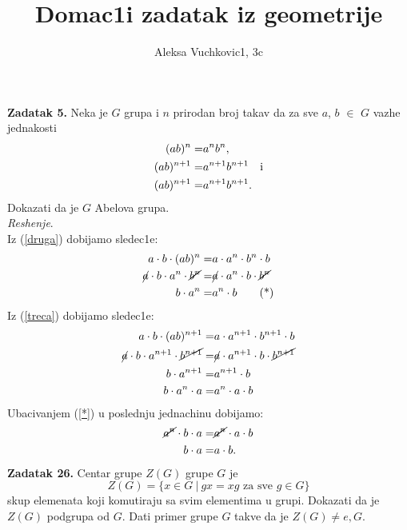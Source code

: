 \documentclass[11pt]{article}
\title{\bf{Domac1i zadatak iz geometrije}}
\author{\Large Aleksa Vuchkovic1, 3c}
\date{}
\begin{document}
\maketitle
\large

\textbf{Zadatak 5.} Neka je $G$ grupa i $n$ prirodan broj takav da za sve $a$, $b$ $\in$ $G$ vazhe jednakosti
\begin{align}
    (ab)^n=&a^nb^n,\\ 
    (ab)^{n+1}=&a^{n+1}b^{n+1} \quad{\text i }\label{druga}\\ 
    (ab)^{n+1}=&a^{n+1}b^{n+1}.\label{treca}
\end{align}
Dokazati da je $G$ Abelova grupa.\\

\textit{Reshenje}.\\
Iz (\ref{druga}) dobijamo sledec1e:
\begin{align*}
    a\cdot b\cdot(ab)^{n}=&a\cdot a^{n}\cdot b^{n}\cdot b\\
    \cancel a\cdot b\cdot a^n\cdot\cancel {b^n}=&\cancel a\cdot a^{n}\cdot b\cdot\cancel {b^{n}}\\
    b\cdot a^n=&a^{n}\cdot b \tag{*}\label{*}
\end{align*}
Iz (\ref{treca}) dobijamo sledec1e:
\begin{align*}
    a\cdot b\cdot(ab)^{n+1}=&a\cdot a^{n+1}\cdot b^{n+1}\cdot b\\
    \cancel a\cdot b\cdot a^{n+1}\cdot\cancel{b^{n+1}}=&\cancel a\cdot a^{n+1}\cdot b\cdot\cancel{b^{n+1}}\\
    b\cdot a^{n+1}=&a^{n+1}\cdot b\\
    b\cdot a^{n}\cdot a=&a^{n}\cdot a\cdot b
\end{align*}
Ubacivanjem (\ref{*}) u poslednju jednachinu dobijamo:
\begin{align*}
    \cancel{a^{n}}\cdot b\cdot a=&\cancel{a^{n}}\cdot a\cdot b\\
    b\cdot a=&a\cdot b.
\end{align*}
\textbf{Zadatak 26.} Centar grupe $Z(G)$ grupe $G$ je $$Z(G)=\{x\in G\ |\ gx=xg \text{ za sve }g\in G\}$$ skup elemenata koji komutiraju sa svim elementima u grupi. Dokazati da je $Z(G)$ podgrupa od $G$. Dati primer grupe $G$ takve da je $Z(G)\not = {e},G.$\\
\end{document}

